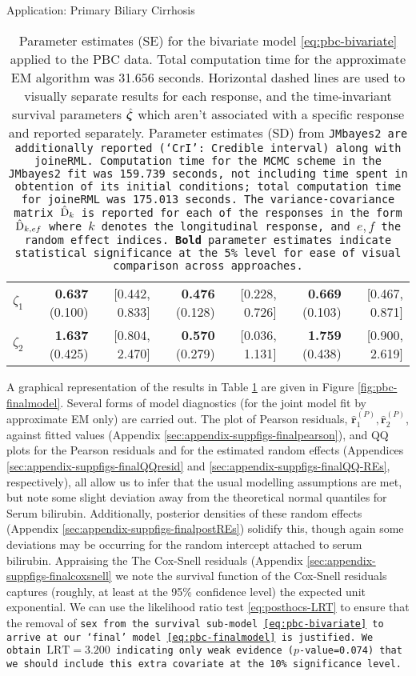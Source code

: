 \begin{chapter}{\label{cha:app-PBC}Application: Primary Biliary Cirrhosis}
\begin{table}[ht]
\begin{tabular}{lrrrrrr}
    \hdashline
    $\zeta_1$ & \textbf{0.637} (0.100) & [0.442, 0.833] & \textbf{0.476} (0.128) & [0.228, 0.726] & \textbf{0.669} (0.103) & [0.467, 0.871] \\ 
    $\zeta_2$ & \textbf{1.637} (0.425) & [0.804, 2.470] & \textbf{0.570} (0.279) & [0.036, 1.131] & \textbf{1.759} (0.438) & [0.900, 2.619] \\ 
    \hline
  \end{tabular}
  \endgroup
  \caption{Parameter estimates (SE) for the bivariate model \eqref{eq:pbc-bivariate} applied to the PBC data. Total computation time for the approximate EM algorithm was 31.656 seconds. Horizontal dashed lines are used to visually separate results for each response, and the time-invariant survival parameters $\hat{\bm{\zeta}}$ which aren't associated with a specific response and reported separately. Parameter estimates (SD) from \tt{JMbayes2} are additionally reported (`CrI': Credible interval) along with \tt{joineRML}. Computation time for the MCMC scheme in the \tt{JMbayes2} fit was 159.739 seconds, not including time spent in obtention of its initial conditions; total computation time for \tt{joineRML} was 175.013 seconds. The variance-covariance matrix $\hat{\mathrm{D}}_k$ is reported for each of the responses in the form $\hat{\mathrm{D}}_{k,ef}$ where $k$ denotes the longitudinal response, and $e,f$ the random effect indices. \textbf{Bold} parameter estimates indicate statistical significance at the 5\% level for ease of visual comparison across approaches.}
  \label{tab:pbc-finalmodel}
  \end{table}

  A graphical representation of the results in Table \ref{tab:pbc-finalmodel} are given in Figure \ref{fig:pbc-finalmodel}. Several forms of model diagnostics (for the joint model fit by approximate EM only) are carried out. The plot of Pearson residuals, $\hat{\bm{r}}^{(P)}_1, \hat{\bm{r}}^{(P)}_2$, against fitted values (Appendix \ref{sec:appendix-suppfigs-finalpearson}), and QQ plots for the Pearson residuals and for the estimated random effects (Appendices \ref{sec:appendix-suppfigs-finalQQresid} and \ref{sec:appendix-suppfigs-finalQQ-REs}, respectively), all allow us to infer that the usual modelling assumptions are met, but note some slight deviation away from the theoretical normal quantiles for Serum bilirubin. Additionally, posterior densities of these random effects (Appendix \ref{sec:appendix-suppfigs-finalpostREs}) solidify this, though again some deviations may be occurring for the random intercept attached to serum bilirubin. Appraising the The Cox-Snell residuals (Appendix \ref{sec:appendix-suppfigs-finalcoxsnell} we note the survival function of the Cox-Snell residuals captures (roughly, at least at the 95\% confidence level) the expected unit exponential. We can use the likelihood ratio test \eqref{eq:posthocs-LRT} to ensure that the removal of \tt{sex} from the survival sub-model \eqref{eq:pbc-bivariate} to arrive at our `final' model \eqref{eq:pbc-finalmodel} is justified. We obtain $\mathrm{LRT}=3.200$ indicating only weak evidence ($p$-value=0.074) that we should include this extra covariate at the 10\% significance level. 


\end{chapter}
